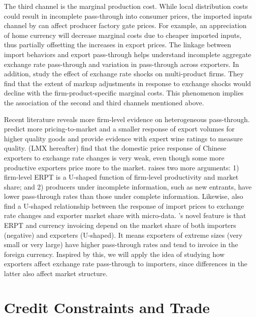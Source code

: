 The third channel is the marginal production cost.  While local distribution costs could result in incomplete pass-through into consumer prices, the imported inputs channel by \cite{aik2014} can affect producer factory gate prices. For example, an appreciation of home currency will decrease marginal costs due to cheaper imported inputs, thus partially offsetting the increases in export prices. The linkage between import behaviors and export pass-through helps understand incomplete aggregate exchange rate pass-through and variation in pass-through across exporters. In addition, \cite{chatterjee2013} study the effect of exchange rate shocks on multi-product firms. They find that the extent of markup adjustments in response to exchange shocks would decline with the firm-product-specific marginal costs. This phenomenon implies the association of the second and third channels mentioned above.

Recent literature reveals more firm-level evidence on heterogeneous pass-through. \cite{chen2016} predict more pricing-to-market and a smaller response of export volumes for higher quality goods and provide evidence with expert wine ratings to measure quality. \cite{lmx2015} (LMX hereafter) find that the domestic price response of Chinese exporters to exchange rate changes is very weak, even though some more productive exporters price more to the market. \cite{garetto2016} raises two more arguments: 1) firm-level ERPT is a U-shaped function of firm-level productivity and market share; and 2) producers under incomplete information, such as new entrants, have lower pass-through rates than those under complete information. Likewise, \cite{auer2016} also find a U-shaped relationship between the response of import prices to exchange rate changes and exporter market share with micro-data. \cite{devereux2017}'s novel feature is that ERPT and currency invoicing depend on the market share of both importers (negative) and exporters (U-shaped). It means exporters of extreme sizes (very small or very large) have higher pass-through rates and tend to invoice in the foreign currency. Inspired by this, we will apply the idea of studying how exporters affect exchange rate pass-through to importers, since differences in the latter also affect market structure.

\section{Credit Constraints and Trade}

